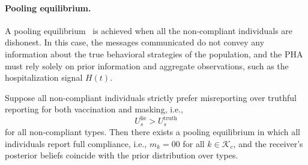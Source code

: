\documentclass[sigconf,review]{acmart}
\begin{document}

\paragraph*{Pooling equilibrium.}


A pooling equilibrium~\cite{HutteggerPNAS2014} is achieved when all the non-compliant individuals are dishonest. In this case, the messages communicated do not convey any information about the true behavioral strategies of the population, and the PHA must rely solely on prior information and aggregate observations, such as the hospitalization signal $H(t)$.

\begin{theorem}
\label{thm:pooling}
Suppose all non-compliant individuals strictly prefer misreporting over truthful reporting for both vaccination and masking, i.e.,
\[
U_s^{\text{lie}} > U_s^{\text{truth}}
\]
for all non-compliant types. Then there exists a pooling equilibrium in which all individuals report full compliance, i.e., $m_k = 00$ for all $k\in\mathcal{K}_c$, and the receiver’s posterior beliefs coincide with the prior distribution over types.
\end{theorem}
\end{document}
